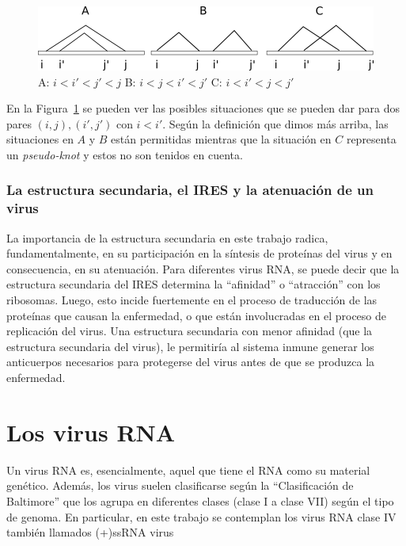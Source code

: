 \begin{figure}
 \centering
  \includegraphics[scale=0.8]{possiblestr}
  \caption{A: $i < i' < j' < j$ B: $i < j < i' < j'$ C: $i < i' < j < j'$}
  \label{possiblestr}
\end{figure}

En la Figura~\ref{possiblestr} se pueden ver las posibles situaciones que se
pueden dar para dos pares $(i,j),(i',j')$ con $i < i'$. Seg\'un la definici\'on
que dimos m\'as arriba, las situaciones en $A$ y $B$ est\'an permitidas mientras
que la situaci\'on en $C$ representa un \textit{pseudo-knot} y estos no son
tenidos en cuenta.

\subsubsection{La estructura secundaria, el \ac{IRES} y la atenuaci\'on de un
virus}

La importancia de la estructura secundaria en este trabajo radica,
fundamentalmente, en su participaci\'on en la s\'intesis de prote\'inas del
virus y en consecuencia, en su atenuaci\'on. Para diferentes virus \ac{RNA}, se
puede decir que la estructura secundaria del \ac{IRES} determina la ``afinidad''
o ``atracci\'on'' con los ribosomas. Luego, esto incide fuertemente en el
proceso de traducci\'on de las prote\'inas que causan la enfermedad, o que
est\'an involucradas en el proceso de replicaci\'on del virus. Una estructura
secundaria con menor afinidad (que la estructura secundaria del virus), le
permitir\'ia al sistema inmune generar los anticuerpos necesarios para
protegerse del virus antes de que se produzca la enfermedad.

\section{Los virus \ac{RNA}}
\label{virus}
Un virus \ac{RNA} es, esencialmente, aquel que tiene el \ac{RNA} como su
material gen\'etico. Adem\'as, los virus suelen clasificarse seg\'un la
``Clasificaci\'on de Baltimore'' que los agrupa en diferentes clases (clase I a
clase VII) seg\'un el tipo de genoma. En particular, en este trabajo se
contemplan los virus \ac{RNA} clase IV tambi\'en llamados \ac{(+)ssRNA virus}

